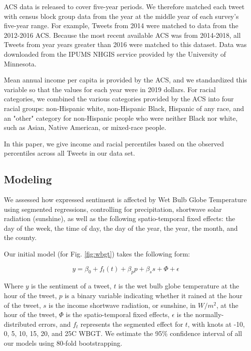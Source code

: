 \documentclass[fleqn,10pt]{wlscirep}
\begin{document}
ACS data is released to cover five-year periods.  We therefore matched each tweet with census block group data from the year at the middle year of each survey's five-year range.  For example, Tweets from 2014 were matched to data from the 2012-2016 ACS.  Because the most recent available ACS was from 2014-2018, all Tweets from year years greater than 2016 were matched to this dataset.  Data was downloaded from the IPUMS NHGIS service provided by the University of Minnesota.

Mean annual income per capita is provided by the ACS, and we standardized this variable so that the values for each year were in 2019 dollars.  For racial categories, we combined the various categories provided by the ACS into four racial groups: non-Hispanic white, non-Hispanic Black, Hispanic of any race, and an "other" category for non-Hispanic people who were neither Black nor white, such as Asian, Native American, or mixed-race people.

In this paper, we give income and racial percentiles based on the observed percentiles across all Tweets in our data set.
    
\subsection*{Modeling}
We assessed how expressed sentiment is affected by Wet Bulb Globe Temperature using segmented regressions, controlling for precipitation, shortwave solar radiation (sunshine), as well as the following spatio-temporal fixed effects: the day of the week, the time of day, the day of the year, the year, the month, and the county.  

Our initial model (for Fig. \ref{fig:wbgt}) takes the following form:

\begin{equation}
    y = \beta_0 + f_t(t) + \beta_p p + \beta_s s + \Phi + \epsilon
    \label{mod:1}
\end{equation}

Where $y$ is the sentiment of a tweet, $t$ is the wet bulb globe temperature at the hour of the tweet, $p$ is a binary variable indicating whether it rained at the hour of the tweet, $s$ is the income shortwave radiation, or sunshine, in $W/m^2$, at the hour of the tweet, $\Phi$ is the spatio-temporal fixed effects, $\epsilon$ is the normally-distributed errors, and $f_t$ represents the segmented effect for $t$, with knots at -10\textdegree, 0\textdegree, 5\textdegree, 10\textdegree, 15\textdegree, 20\textdegree, and 25\textdegree C WBGT.  We estimate the 95\% confidence interval of all our models using 80-fold bootstrapping.  
\end{document}
